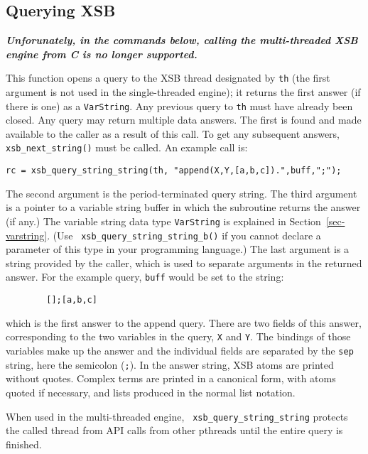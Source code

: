 \subsection{Querying XSB}
           {\bf {\em Unforunately, in the commands below, calling the multi-threaded XSB engine from C is no longer supported.}}

\begin{description}
%
This function opens a query to the XSB thread designated by {\tt th}
(the first argument is not used in the single-threaded engine); it
returns the first answer (if there is one) as a {\tt VarString}.  Any
previous query to {\tt th} must have already been closed.  Any query
may return multiple data answers.  The first is found and made
available to the caller as a result of this call.  To get any
subsequent answers, {\tt xsb\_next\_string()} must be called.  An
example call is:
\begin{verbatim}
rc = xsb_query_string_string(th, "append(X,Y,[a,b,c]).",buff,";");
\end{verbatim}
The second argument is the period-terminated query string.  The third
argument is a pointer to a variable string buffer in which the
subroutine returns the answer (if any.) The variable string data type
{\tt VarString} is explained in Section~\ref{sec-varstring}. (Use {\tt
  xsb\_query\_string\_string\_b()} if you cannot declare a parameter
of this type in your programming language.)  The last argument is a
string provided by the caller, which is used to separate arguments in
the returned answer.  For the example query, {\tt buff} would be set
to the string:
\begin{verbatim}
        [];[a,b,c]
\end{verbatim}
which is the first answer to the append query.  There are two fields
of this answer, corresponding to the two variables in the query,
\verb|X| and \verb|Y|.  The bindings of those variables make up the
answer and the individual fields are separated by the \verb|sep|
string, here the semicolon (\verb|;|).  In the answer string, XSB
atoms are printed without quotes.  Complex terms are printed in a
canonical form, with atoms quoted if necessary, and lists produced in
the normal list notation.

When used in the multi-threaded engine, {\tt
  xsb\_query\_string\_string} protects the called thread from API
calls from other pthreads until the entire query is finished.


\end{description}
